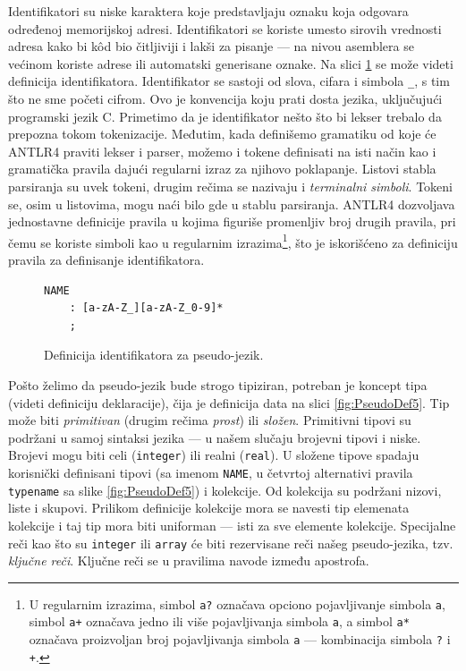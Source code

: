 Identifikatori su niske karaktera koje predstavljaju oznaku koja odgovara određenoj memorijskoj adresi. Identifikatori se koriste umesto sirovih vrednosti adresa kako bi k\^od bio čitljiviji i lakši za pisanje --- na nivou asemblera se većinom koriste adrese ili automatski generisane oznake. Na slici \ref{fig:PseudoDef4} se može videti definicija identifikatora. Identifikator se sastoji od slova, cifara i simbola \texttt{\_}, s tim što ne sme početi cifrom. Ovo je konvencija koju prati dosta jezika, uključujući programski jezik C. Primetimo da je identifikator nešto što bi lekser trebalo da prepozna tokom tokenizacije. Međutim, kada definišemo gramatiku od koje će ANTLR4 praviti lekser i parser, možemo i tokene definisati na isti način kao i gramatička pravila dajući regularni izraz za njihovo poklapanje. Listovi stabla parsiranja su uvek tokeni, drugim rečima se nazivaju i \emph{terminalni simboli}. Tokeni se, osim u listovima, mogu naći bilo gde u stablu parsiranja. ANTLR4 dozvoljava jednostavne definicije pravila u kojima figuriše promenljiv broj drugih pravila, pri čemu se koriste simboli kao u regularnim izrazima\footnote{U regularnim izrazima, simbol \texttt{a?} označava opciono pojavljivanje simbola \texttt{a}, simbol \texttt{a+} označava jedno ili više pojavljivanja simbola \texttt{a}, a simbol \texttt{a*} označava proizvoljan broj pojavljivanja simbola \texttt{a} --- kombinacija simbola \texttt{?} i \texttt{+}.}, što je iskorišćeno za definiciju pravila za definisanje identifikatora.

\begin{figure}[h!]
\begin{lstlisting}[language={}]
NAME
    : [a-zA-Z_][a-zA-Z_0-9]*
    ;
\end{lstlisting}
\caption{Definicija identifikatora za pseudo-jezik.}
\label{fig:PseudoDef4}
\end{figure}

Pošto želimo da pseudo-jezik bude strogo tipiziran, potreban je koncept tipa (videti definiciju deklaracije), čija je definicija data na slici \ref{fig:PseudoDef5}. Tip može biti \emph{primitivan} (drugim rečima \emph{prost}) ili \emph{složen}. Primitivni tipovi su podržani u samoj sintaksi jezika --- u našem slučaju brojevni tipovi i niske. Brojevi mogu biti celi (\texttt{integer}) ili realni (\texttt{real}). U složene tipove spadaju korisnički definisani tipovi (sa imenom \texttt{NAME}, u četvrtoj alternativi pravila \texttt{typename} sa slike \ref{fig:PseudoDef5}) i kolekcije. Od kolekcija su podržani nizovi, liste i skupovi. Prilikom definicije kolekcije mora se navesti tip elemenata kolekcije i taj tip mora biti uniforman --- isti za sve elemente kolekcije. Specijalne reči kao što su \texttt{integer} ili \texttt{array} će biti rezervisane reči našeg pseudo-jezika, tzv. \emph{ključne reči}. Ključne reči se u pravilima navode između apostrofa.

